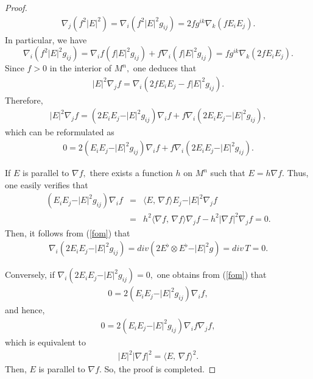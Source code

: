 \documentclass{amsart}
\numberwithin{equation}{section}
\begin{document}
\begin{proof}
	\begin{eqnarray*}
		\nabla_j(f^{2}\vert E\vert^{2})=\nabla_i(f^{2}\vert E\vert^{2}g_{ij}) = 2fg^{ik}\nabla_k(fE_i E_j).
	\end{eqnarray*} In particular, we have
	$$\nabla_{i}(f^2 |E|^2 g_{ij})=\nabla_{i}f (f|E|^2 g_{ij}) + f\nabla_{i}(f|E|^2 g_{ij})=fg^{ik}\nabla_k(2fE_i E_j).$$ Since $f>0$ in the interior of $M^n,$ one deduces that  
	\begin{eqnarray*}
		\vert E\vert^{2}\nabla_jf= \nabla_i(2fE_i E_j - f\vert E\vert^{2}g_{ij}).
	\end{eqnarray*} Therefore,
	\begin{eqnarray*}
		\vert E\vert^{2}\nabla_jf= (2E_i E_j - \vert E\vert^{2}g_{ij})\nabla_i f + f\nabla_i(2E_i E_j - \vert E\vert^{2}g_{ij}),
	\end{eqnarray*} which can be reformulated as		
	\begin{eqnarray}\label{fom}
		0= 2(E_i E_j - \vert E\vert^{2}g_{ij})\nabla_i f + f\nabla_i(2E_i E_j - \vert E\vert^{2}g_{ij}).
	\end{eqnarray}		
	
	
	
If $E$ is parallel to $\nabla f,$ there exists a function $h$ on $M^n$ such that $E = h\nabla f.$ Thus, one easily verifies that
	\begin{eqnarray*}
		(E_i E_j - \vert E\vert^{2}g_{ij})\nabla_i f &=& \langle E,\,\nabla f\rangle E_j - \vert E\vert^{2}\nabla_j f\nonumber\\&=& h^2\langle \nabla f,\,\nabla f\rangle \nabla_jf - h^2\vert \nabla f\vert^{2}\nabla_j f = 0.
	\end{eqnarray*}	
Then, it follows from (\ref{fom}) that 
	\begin{eqnarray}
	\label{kjhgf019}
		\nabla_i(2E_i E_j - \vert E\vert^{2}g_{ij})=div \left(2E^\flat\otimes E^{\flat} - \vert E\vert^{2}g\right)=div\,T=0.
	\end{eqnarray}


Conversely, if $\nabla_i(2E_i E_j - \vert E\vert^{2}g_{ij})=0,$ one obtains from (\ref{fom}) that
	\begin{eqnarray*}
		0= 2(E_i E_j - \vert E\vert^{2}g_{ij})\nabla_i f,
	\end{eqnarray*}
	and hence,
	\begin{eqnarray*}
		0= 2(E_i E_j - \vert E\vert^{2}g_{ij})\nabla_i f\nabla_j f,
	\end{eqnarray*}
	which is equivalent to 
	\begin{eqnarray*}
		\vert E\vert^{2}\vert\nabla f\vert^{2} = \langle E,\,\nabla f\rangle^{2}.
	\end{eqnarray*} Then, $E$ is parallel to $\nabla f$. So, the proof is completed. 
\end{proof}
\end{document}
